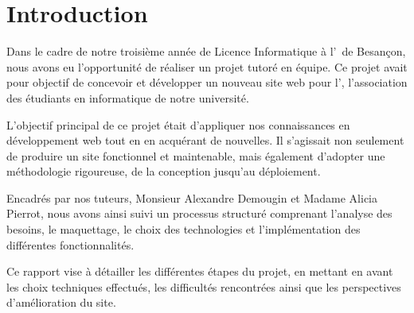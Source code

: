 \chapter{Introduction}

Dans le cadre de notre troisième année de Licence Informatique à l’\univ\ de Besançon, nous avons eu l’opportunité de réaliser un projet tutoré en équipe. Ce projet avait pour objectif de concevoir et développer un nouveau site web pour l’\ofni\@ , l’association des étudiants en informatique de notre université.
\bigskip

L’objectif principal de ce projet était d’appliquer nos connaissances en développement web tout en en acquérant de nouvelles. Il s’agissait non seulement de produire un site fonctionnel et maintenable, mais également d’adopter une méthodologie rigoureuse, de la conception jusqu’au déploiement. 

Encadrés par nos tuteurs, Monsieur Alexandre Demougin et Madame Alicia Pierrot, nous avons ainsi suivi un processus structuré comprenant l’analyse des besoins, le maquettage, le choix des technologies et l’implémentation des différentes fonctionnalités.
\bigskip

Ce rapport vise à détailler les différentes étapes du projet, en mettant en avant les choix techniques effectués, les difficultés rencontrées ainsi que les perspectives d’amélioration du site.

